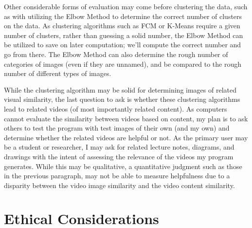 \documentclass[10pt,twocolumn]{article}
\begin{document}
Other considerable forms of evaluation may come before clustering the data, such as with utilizing the Elbow Method to determine the correct number of clusters on the data. As clustering algorithms such as FCM or K-Means require a given number of clusters, rather than guessing a solid number, the Elbow Method can be utilized to save on later computation; we'll compute the correct number and go from there. The Elbow Method can also determine the rough number of categories of images (even if they are unnamed), and be compared to the rough number of different types of images.

While the clustering algorithm may be solid for determining images of related visual similarity, the last question to ask is whether these clustering algorithms lead to related videos (of most importantly related content). As computers cannot evaluate the similarity between videos based on content, my plan is to ask others to test the program with test images of their own (and my own) and determine whether the related videos are helpful or not. As the primary user may be a student or researcher, I may ask for related lecture notes, diagrams, and drawings with the intent of assessing the relevance of the videos my program generates. While this may be qualitative, a quantitative judgment such as those in the previous paragraph, may not be able to measure helpfulness due to a disparity between the video image similarity and the video content similarity.


\section {Ethical Considerations}

\end{document}

